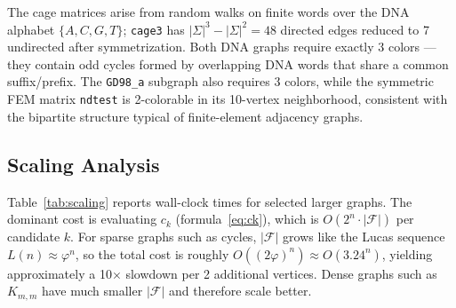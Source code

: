 \documentclass[11pt]{article}
\begin{document}
The cage matrices arise from random walks on finite words over the DNA
alphabet $\{A, C, G, T\}$; \texttt{cage3} has $|\Sigma|^3 - |\Sigma|^2 = 48$
directed edges reduced to 7 undirected after symmetrization.  Both DNA graphs
require exactly 3 colors --- they contain odd cycles formed by overlapping
DNA words that share a common suffix/prefix.  The \texttt{GD98\_a} subgraph
also requires 3 colors, while the symmetric FEM matrix \texttt{ndtest} is
2-colorable in its 10-vertex neighborhood, consistent with the bipartite
structure typical of finite-element adjacency graphs.

\subsection{Scaling Analysis}

Table~\ref{tab:scaling} reports wall-clock times for selected larger graphs.
The dominant cost is evaluating $c_k$ (formula~\eqref{eq:ck}), which is
$O(2^n \cdot |\mathcal{F}|)$ per candidate $k$.  For sparse graphs such as
cycles, $|\mathcal{F}|$ grows like the Lucas sequence $L(n) \approx \varphi^n$,
so the total cost is roughly $O((2\varphi)^n) \approx O(3.24^n)$, yielding
approximately a 10$\times$ slowdown per 2 additional vertices.  Dense graphs
such as $K_{m,m}$ have much smaller $|\mathcal{F}|$ and therefore scale better.
\end{document}
